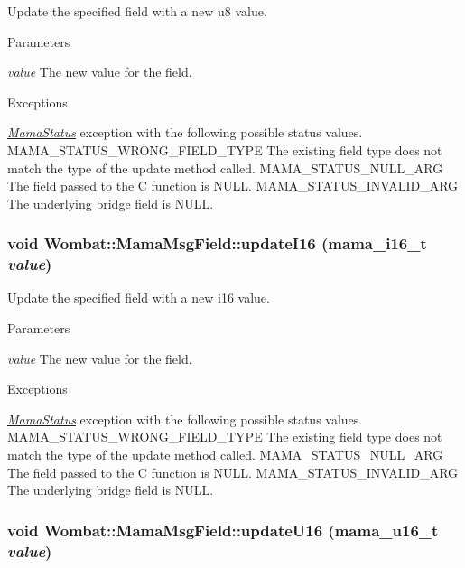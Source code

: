 Update the specified field with a new u8 value. 
\begin{DoxyParams}{Parameters}
\item[{\em value}]The new value for the field.\end{DoxyParams}

\begin{DoxyExceptions}{Exceptions}
\item[{\em \hyperlink{classWombat_1_1MamaStatus}{MamaStatus}}]exception with the following possible status values. MAMA\_\-STATUS\_\-WRONG\_\-FIELD\_\-TYPE The existing field type does not match the type of the update method called. MAMA\_\-STATUS\_\-NULL\_\-ARG The field passed to the C function is NULL. MAMA\_\-STATUS\_\-INVALID\_\-ARG The underlying bridge field is NULL. \end{DoxyExceptions}
\hypertarget{classWombat_1_1MamaMsgField_a9250e1a6658974be65f58cfd4765478f}{
\subsubsection[{updateI16}]{\setlength{\rightskip}{0pt plus 5cm}void Wombat::MamaMsgField::updateI16 (mama\_\-i16\_\-t {\em value})}}
\label{classWombat_1_1MamaMsgField_a9250e1a6658974be65f58cfd4765478f}


Update the specified field with a new i16 value. 
\begin{DoxyParams}{Parameters}
\item[{\em value}]The new value for the field.\end{DoxyParams}

\begin{DoxyExceptions}{Exceptions}
\item[{\em \hyperlink{classWombat_1_1MamaStatus}{MamaStatus}}]exception with the following possible status values. MAMA\_\-STATUS\_\-WRONG\_\-FIELD\_\-TYPE The existing field type does not match the type of the update method called. MAMA\_\-STATUS\_\-NULL\_\-ARG The field passed to the C function is NULL. MAMA\_\-STATUS\_\-INVALID\_\-ARG The underlying bridge field is NULL. \end{DoxyExceptions}
\hypertarget{classWombat_1_1MamaMsgField_a86945aab1277bc5bbe80155ae4ceac64}{
\subsubsection[{updateU16}]{\setlength{\rightskip}{0pt plus 5cm}void Wombat::MamaMsgField::updateU16 (mama\_\-u16\_\-t {\em value})}}
\label{classWombat_1_1MamaMsgField_a86945aab1277bc5bbe80155ae4ceac64}


